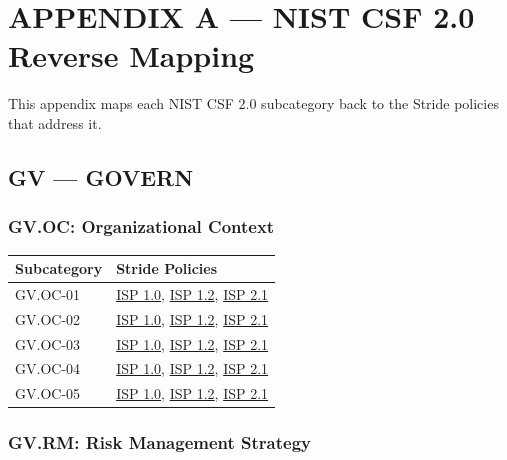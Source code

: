\documentclass[11pt,landscape]{article}
\begin{document}
\newpage
\appendix
\section{APPENDIX A --- NIST CSF 2.0 Reverse Mapping}
\label{app:nist}

This appendix maps each NIST CSF 2.0 subcategory back to the Stride policies that address it.

\subsection{GV --- GOVERN}

\subsubsection{GV.OC: Organizational Context}

\begin{tabularx}{\textwidth}{|p{3.5cm}|X|}
\hline
\rowcolor{headgray} \textbf{Subcategory} & \textbf{Stride Policies} \\
\hline
GV.OC-01 & \hyperref[pol:ISP10]{ISP 1.0}, \hyperref[pol:ISP12]{ISP 1.2}, \hyperref[pol:ISP21]{ISP 2.1} \\
\hline
GV.OC-02 & \hyperref[pol:ISP10]{ISP 1.0}, \hyperref[pol:ISP12]{ISP 1.2}, \hyperref[pol:ISP21]{ISP 2.1} \\
\hline
GV.OC-03 & \hyperref[pol:ISP10]{ISP 1.0}, \hyperref[pol:ISP12]{ISP 1.2}, \hyperref[pol:ISP21]{ISP 2.1} \\
\hline
GV.OC-04 & \hyperref[pol:ISP10]{ISP 1.0}, \hyperref[pol:ISP12]{ISP 1.2}, \hyperref[pol:ISP21]{ISP 2.1} \\
\hline
GV.OC-05 & \hyperref[pol:ISP10]{ISP 1.0}, \hyperref[pol:ISP12]{ISP 1.2}, \hyperref[pol:ISP21]{ISP 2.1} \\
\hline
\end{tabularx}

\subsubsection{GV.RM: Risk Management Strategy}
\end{document}
